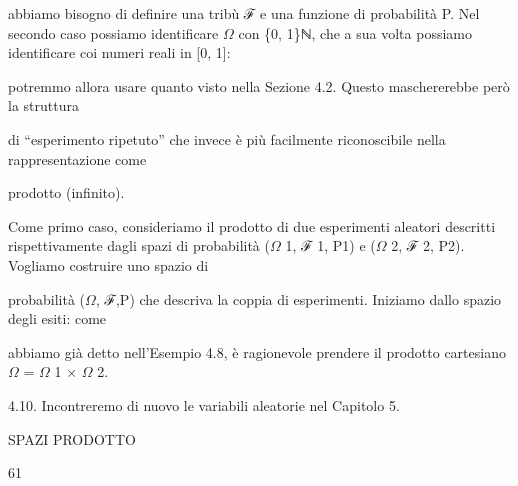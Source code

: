 \documentclass[a4paper,portrait,12pt]{article}
\begin{document}
\begin{flushleft}
abbiamo bisogno di definire una tribù ℱ e una funzione di probabilit\`{a} P. Nel secondo caso possiamo identificare $\Omega$ con \{0, 1\}ℕ, che a sua volta possiamo identificare coi numeri reali in [0, 1]:
\end{flushleft}


\begin{flushleft}
potremmo allora usare quanto visto nella Sezione 4.2. Questo maschererebbe per\`{o} la struttura
\end{flushleft}


\begin{flushleft}
di ``esperimento ripetuto'' che invece \`{e} più facilmente riconoscibile nella rappresentazione come
\end{flushleft}


\begin{flushleft}
prodotto (infinito).
\end{flushleft}


\begin{flushleft}
Come primo caso, consideriamo il prodotto di due esperimenti aleatori descritti rispettivamente dagli spazi di probabilit\`{a} ($\Omega$ 1, ℱ 1, P1) e ($\Omega$ 2, ℱ 2, P2). Vogliamo costruire uno spazio di
\end{flushleft}


\begin{flushleft}
probabilit\`{a} ($\Omega$, ℱ,P) che descriva la coppia di esperimenti. Iniziamo dallo spazio degli esiti: come
\end{flushleft}


\begin{flushleft}
abbiamo gi\`{a} detto nell'Esempio 4.8, \`{e} ragionevole prendere il prodotto cartesiano $\Omega$ = $\Omega$ 1 × $\Omega$ 2.
\end{flushleft}


\begin{flushleft}
4.10. Incontreremo di nuovo le variabili aleatorie nel Capitolo 5.
\end{flushleft}





\begin{flushleft}
 SPAZI PRODOTTO
\end{flushleft}





61
\end{document}
